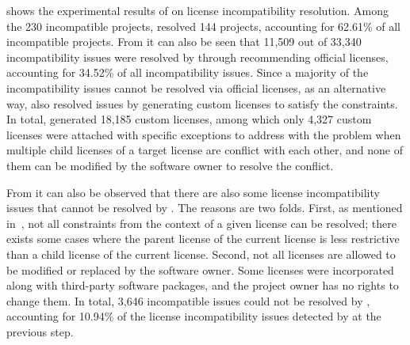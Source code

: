  shows the experimental results of \tool on license incompatibility resolution. Among the 230 incompatible projects, \tool resolved 144 projects, accounting for 62.61\% of all incompatible projects. From  it can also be seen that {11,509} out of 33,340 incompatibility issues were resolved by \tool through recommending official licenses, accounting for {34.52\%} of all incompatibility issues. %
%
Since a majority of the incompatibility issues cannot be resolved via official licenses, as an alternative way, \tool also resolved issues by generating custom licenses to satisfy the constraints. In total, \tool generated {18,185} custom licenses, among which only {4,327} custom licenses were attached with specific exceptions to address with the problem when multiple child licenses of a target license are conflict with each other, and none of them can be modified by the software owner to resolve the conflict. 


From  it can also be observed that there are also some license incompatibility issues that cannot be resolved by \tool. The reasons are two folds. First, as mentioned in~, not all constraints from the context of a given license can be resolved; there exists some cases where the parent license of the current license is less restrictive than a child license of the current license. Second, not all licenses are allowed to be modified or replaced by the software owner. Some licenses were incorporated along with third-party software packages, and the project owner has no rights to change them. %
In total, {3,646} incompatible issues could not be resolved by \tool, accounting for {10.94\%} of the license incompatibility issues detected by \tool at the previous step.

